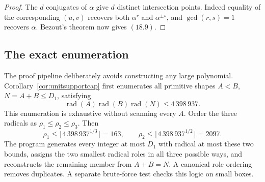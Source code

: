 \documentclass[11pt]{article}
\theoremstyle{definition}
\begin{document}
\begin{proof}
The \(d\) conjugates of \(\alpha\) give \(d\) distinct intersection points.
Indeed equality of the corresponding \((u,v)\) recovers both
\(\alpha^r\) and \(\alpha^{\pm s}\), and \(\gcd(r,s)=1\) recovers
\(\alpha\).  Bezout's theorem now gives \((18.9)\).
\end{proof}

\subsection{The exact enumeration}

The proof pipeline deliberately avoids constructing any large polynomial.
Corollary~\ref{cor:unitsupportcap} first enumerates all primitive shapes
\(A<B\), \(N=A+B\leq D_1\), satisfying
\[
 \operatorname{rad}(A)\operatorname{rad}(B)\operatorname{rad}(N)
 \leq4\,398\,937.
\]
This enumeration is exhaustive without scanning every \(A\).  Order the
three radicals as \(\rho_1\leq\rho_2\leq\rho_3\).  Then
\[
 \rho_1\leq\lfloor4\,398\,937^{1/3}\rfloor=163,
 \qquad
 \rho_2\leq\lfloor4\,398\,937^{1/2}\rfloor=2097.
\]
The program generates every integer at most \(D_1\) with radical at most
these two bounds, assigns the two smallest radical roles in all three possible
ways, and reconstructs the remaining member from \(A+B=N\).  A canonical
role ordering removes duplicates.  A separate brute-force test checks this
logic on small boxes.
\end{document}
